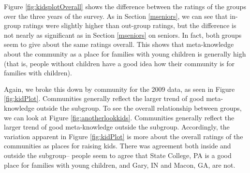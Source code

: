 \documentclass[smallextended]{svjour3}\usepackage[]{graphicx}\usepackage[]{color}
\begin{document}
Figure \ref{fig:kidsplotOverall} shows the difference between the ratings of the groups over the three years of the survey. As in Section \ref{mseniors}, we can see that in-group ratings were slightly higher than out-group ratings, but the difference is not nearly as significant as in Section \ref{mseniors} on seniors. In fact, both groups seem to give about the same ratings overall. This shows that meta-knowledge about the community as a place for families with young children is generally high (that is, people without children have a good idea how their community is for families with children).

Again, we broke this down by community for the 2009 data, as seen in Figure \ref{fig:kidPlot}. Communities generally reflect the larger trend of good meta-knowledge outside the subgroup. To see the overall relationship between groups, we can look at Figure \ref{fig:anotherlookkids}. Communities generally reflect the larger trend of good meta-knowledge outside the subgroup. Accordingly, the variation apparent in Figure \ref{fig:kidPlot} is more about the overall ratings of the communities as places for raising kids. There was agreement both inside and outside the subgroup-- people seem to agree that State College, PA is a good place for families with young children, and Gary, IN and Macon, GA, are not. 
\end{document}
